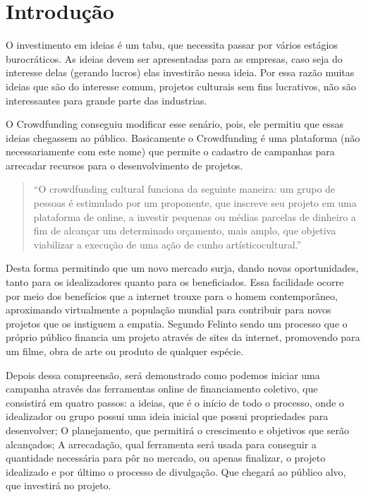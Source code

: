 \documentclass{classe_cn}                 %
\begin{document}
\section{Introdução}
O investimento em ideias é um tabu, que necessita passar por vários estágios burocráticos. As ideias devem ser apresentadas para as empresas, caso seja do interesse delas (gerando lucros) elas investirão nessa ideia. Por essa razão muitas ideias que são do interesse comum, projetos culturais sem fins lucrativos, não são interessantes para grande parte das industrias.

O Crowdfunding conseguiu modificar esse senário, pois, ele permitiu que essas ideias chegassem ao público. Basicamente o Crowdfunding é uma plataforma (não necessariamente com este nome) que permite o cadastro de campanhas para arrecadar recursos para o desenvolvimento de projetos.

\begin{quote}
“O crowdfunding cultural funciona da seguinte maneira: um grupo de pessoas é estimulado por um proponente, que inscreve seu projeto em uma plataforma de online, a investir pequenas ou médias parcelas de dinheiro a fim de alcançar um determinado orçamento, mais amplo, que objetiva viabilizar a execução de uma ação de cunho artísticocultural.”\cite[p. 3]{SEQUEIRA:sd}
 \end{quote}

Desta forma permitindo que um novo mercado surja, dando novas oportunidades, tanto para os idealizadores quanto para os beneficiados. Essa facilidade ocorre por meio dos benefícios que a internet trouxe para o homem contemporâneo, aproximando virtualmente a população mundial para contribuir para novos projetos que os instiguem a empatia. Segundo Felinto \cite{FELINTO:2012} sendo um processo que o próprio público financia um projeto através de sites da internet, promovendo para um filme, obra de arte ou produto de qualquer espécie.

Depois dessa compreensão, será demonstrado como podemos iniciar uma campanha através das ferramentas online de financiamento coletivo, que consistirá em quatro passos: a ideias, que é o início de todo o processo, onde o idealizador ou grupo possui uma ideia inicial que possui propriedades para desenvolver; O planejamento, que permitirá o crescimento e objetivos que serão alcançados; A arrecadação, qual ferramenta será usada para conseguir a quantidade necessária para pôr no mercado, ou apenas finalizar, o projeto idealizado e por último o processo de divulgação. Que chegará ao público alvo, que investirá no projeto.
\end{document}
